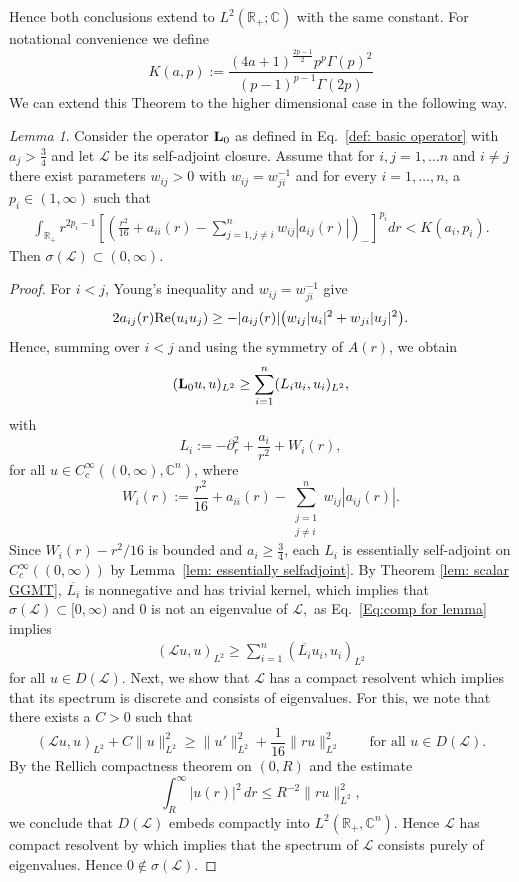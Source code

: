 \documentclass[11pt,reqno]{amsart}
\theoremstyle{remark}
\newtheorem{lem}{Lemma}[section]
\newcommand{\R}{\mathbb{R}}
\newcommand{\Lf}{\textup{\textbf{L}}}
\renewcommand{\Re}{\textup{Re}}
\newcommand{\C}{\mathbb{C}}
\theoremstyle{definition}
\begin{document}
Hence both conclusions extend to
$L^2(\R_+;\mathbb C)$ with the same constant.
For notational convenience we define 
\[
K(a,p):= \frac{(4 a+1)^{\frac{2p-1}{2}} p^p\Gamma(p)^2}{(p-1)^{p-1}\Gamma(2p)} 
\]
We can extend this Theorem to the higher dimensional case in the following way.
\begin{lem}\label{lem: GGMT vector}
Consider the operator $\Lf_0$ as defined in Eq.~\eqref{def: basic operator} with $a_j>\frac{3}{4}$ and let $\mathcal{L}$ be its self-adjoint closure. 
    Assume that for $i,j=1,\dots n$ and $i\neq j$ there exist parameters $w_{ij}>0 $ with $w_{ij}=w_{ji}^{-1} $ and for every $i=1,\dots,n$, a $p_i\in (1,\infty)$ such that 
    \begin{align}   
  \int_{\R_+} r^{2p_i-1}\left[\left( \frac{r^2}{16}+a_{ii}(r)- \sum_{j=1, j\neq i}^n w_{ij}|a_{ij}(r)| \right)_-\right]^{p_i} dr <K(a_i,p_i) .
\end{align}
 Then $\sigma(\mathcal{L})\subset(0,\infty)$.
\end{lem}
\begin{proof}

For $i<j$, Young's inequality and $w_{ij}=w_{ji}^{-1}$ give
\[
    2a_{ij}(r) \Re (u_i u_j)
    \geq -|a_{ij}(r)|
    \bigl(w_{ij}|u_i|^2+w_{ji}|u_j|^2\bigr).
\]
Hence, summing over $i<j$ and using the symmetry of $A(r)$, we obtain
\begin{equation}\label{Eq:comp for lemma}
        (\Lf_0u,u)_{L^2}
    \geq \sum_{i=1}^n (L_i u_i,u_i)_{L^2},
\end{equation}
with
 \[ 
    L_i:=-\partial_r^2+\frac{a_i}{r^2}+W_i(r),
\]
for all $u\in C_c^\infty((0,\infty),\C^n)$, where
\[ W_i(r):=\frac{r^2}{16}+a_{ii}(r)
    -\sum_{\substack{j=1\\j\neq i}}^n w_{ij}|a_{ij}(r)|.\]
Since $W_i(r)-r^2/16$ is bounded and $a_i\geq\frac34$, each $L_i$
is essentially self-adjoint on $C_c^\infty((0,\infty))$ by
Lemma~\ref{lem: essentially selfadjoint}. By Theorem \ref{lem: scalar GGMT}, $\overline{L_i}$ is nonnegative
and has trivial kernel,
which implies that
$
\sigma(\mathcal{L})\subset [0,\infty)$ and $0$ is not an eigenvalue of $ \mathcal{L},$ as Eq.~\eqref{Eq:comp for lemma} implies 
\begin{align*}
     (\mathcal{L} u,u)_{L^2}
    \geq \sum_{i=1}^n (\overline{L_i} u_i,u_i)_{L^2}
\end{align*}
for all $u\in D(\mathcal{L})$. Next, we show that $\mathcal{L}$ has a compact resolvent which implies that its spectrum is discrete and consists of eigenvalues. For this, we note that there exists a $C>0$ such that
\[
    (\mathcal{L}u,u)_{L^2}+C\|u\|_{L^2}^2
    \geq \|u'\|_{L^2}^2+\frac{1}{16}\|ru\|_{L^2}^2
    \qquad \text{for all } u\in D(\mathcal{L}).
\]
By the Rellich compactness theorem on $(0,R)$ and the estimate
\[
    \int_R^\infty |u(r)|^2\,dr
    \leq R^{-2}\|ru\|_{L^2}^2,
\]
we conclude that $D(\mathcal{L})$ embeds compactly into $L^2(\R_+,\C^n)$.
Hence $\mathcal L$ has compact resolvent by
\cite[Theorem~XIII.64]{ReeSim78} which implies that the spectrum of $\mathcal{L}$ consists purely of eigenvalues. Hence $0 \notin \sigma(\mathcal{L}).$
\end{proof}
\end{document}
